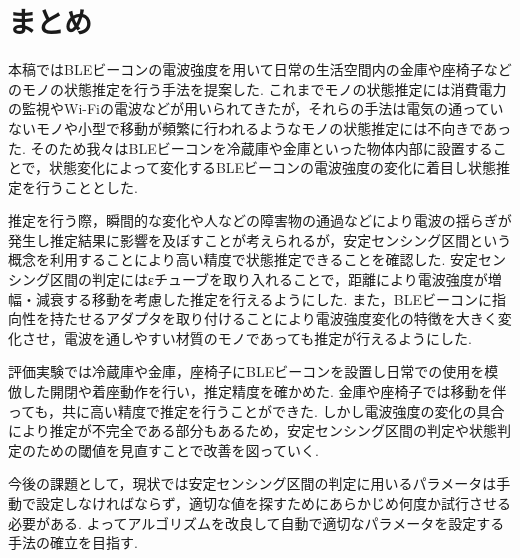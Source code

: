 \documentclass[Japanese]{dicomopapers}
\begin{document}
\section{まとめ}
本稿ではBLEビーコンの電波強度を用いて日常の生活空間内の金庫や座椅子などのモノの状態推定を行う手法を提案した.
これまでモノの状態推定には消費電力の監視やWi-Fiの電波などが用いられてきたが，それらの手法は電気の通っていないモノや小型で移動が頻繁に行われるようなモノの状態推定には不向きであった.
そのため我々はBLEビーコンを冷蔵庫や金庫といった物体内部に設置することで，状態変化によって変化するBLEビーコンの電波強度の変化に着目し状態推定を行うこととした.

推定を行う際，瞬間的な変化や人などの障害物の通過などにより電波の揺らぎが発生し推定結果に影響を及ぼすことが考えられるが，安定センシング区間という概念を利用することにより高い精度で状態推定できることを確認した.
安定センシング区間の判定にはεチューブを取り入れることで，距離により電波強度が増幅・減衰する移動を考慮した推定を行えるようにした.
また，BLEビーコンに指向性を持たせるアダプタを取り付けることにより電波強度変化の特徴を大きく変化させ，電波を通しやすい材質のモノであっても推定が行えるようにした.

評価実験では冷蔵庫や金庫，座椅子にBLEビーコンを設置し日常での使用を模倣した開閉や着座動作を行い，推定精度を確かめた.
金庫や座椅子では移動を伴っても，共に高い精度で推定を行うことができた.
しかし電波強度の変化の具合により推定が不完全である部分もあるため，安定センシング区間の判定や状態判定のための閾値を見直すことで改善を図っていく.

今後の課題として，現状では安定センシング区間の判定に用いるパラメータは手動で設定しなければならず，適切な値を探すためにあらかじめ何度か試行させる必要がある.
よってアルゴリズムを改良して自動で適切なパラメータを設定する手法の確立を目指す.


\end{document}
